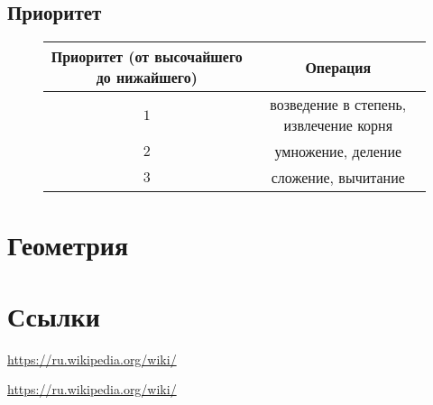 \documentclass[fleqn,11pt]{article}
\theoremstyle{definition}
\begin{document}
\FloatBarrier
\subsection{Приоритет}
\begin{figure}
\begin{tabular}{|c|c|} \hline
    Приоритет \footnotesize{(от высочайшего до нижайшего)} & Операция \\ \hline \hline
    $1$ & возведение в степень, извлечение корня \\ \hline
    $2$ & умножение, деление \\ \hline
    $3$ & сложение, вычитание \\ \hline
\end{tabular}
\caption{}
\end{figure}

\FloatBarrier
\section{Геометрия}

\pagebreak
\printbibliography \label{sec:bib}

\section{Ссылки}
\begin{description}[align=right,labelwidth=4cm]
  \item [Натуральное число] {\href{https://ru.wikipedia.org/wiki/%D0%9D%D0%B0%D1%82%D1%83%D1%80%D0%B0%D0%BB%D1%8C%D0%BD%D0%BE%D0%B5_%D1%87%D0%B8%D1%81%D0%BB%D0%BE}{https://ru.wikipedia.org/wiki/\textcyrillic{Натуральное{\_}число}}}
  \item [Сложение]{\href{https://ru.wikipedia.org/wiki/%D0%A1%D0%BB%D0%BE%D0%B6%D0%B5%D0%BD%D0%B8%D0%B5}{https://ru.wikipedia.org/wiki/\textcyrillic{Сложение}}}
\end{description}
\end{document}
